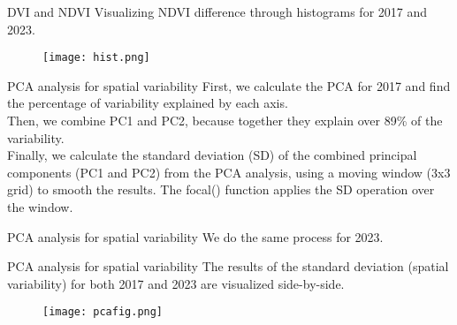 \documentclass{beamer}
\begin{document}
\begin{frame}{DVI and NDVI}
    Visualizing NDVI difference through histograms for 2017 and 2023.
     
     \begin{figure}
         \centering
         \texttt{[image: hist.png]}
     \end{figure}
\end{frame}

\begin{frame}{PCA analysis for spatial variability}
    \small{First, we calculate the PCA for 2017 and find the percentage of variability explained by each axis.
    \\ Then, we combine PC1 and PC2, because together they explain over 89\% of the variability.
    \\Finally, we calculate the standard deviation (SD) of the combined principal components (PC1 and PC2) from the PCA analysis, using a moving window (3x3 grid) to smooth the results. The focal() function applies the SD operation over the window.}
     
\end{frame}

\begin{frame}{PCA analysis for spatial variability}
    We do the same process for 2023.
     
\end{frame}

\begin{frame}{PCA analysis for spatial variability}
    The results of the standard deviation (spatial variability) for both 2017 and 2023 are visualized side-by-side.
     
      \begin{figure}
         \centering
         \texttt{[image: pcafig.png]}
     \end{figure}
\end{frame}
\end{document}
